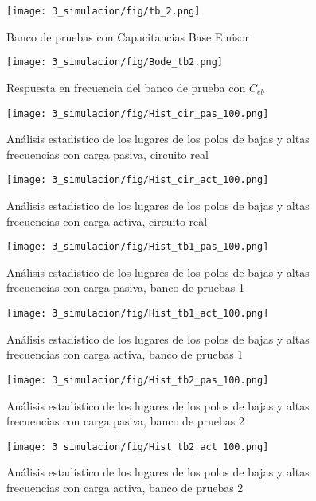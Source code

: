 \begin{figure}
    \centering
    \texttt{[image: 3\_simulacion/fig/tb\_2.png]}
    \caption{Banco de pruebas con Capacitancias Base Emisor}
\end{figure}

\begin{figure}
    \centering
    \texttt{[image: 3\_simulacion/fig/Bode\_tb2.png]}
    \caption{Respuesta en frecuencia del banco de prueba con $C_{eb}$}
    \label{fig:bode_tb2}
\end{figure}

\begin{figure}
    \centering
    \texttt{[image: 3\_simulacion/fig/Hist\_cir\_pas\_100.png]}
    \caption{Análisis estadístico de los lugares de los polos de bajas y altas frecuencias con carga pasiva, circuito real}
\end{figure}

\begin{figure}
    \centering
    \texttt{[image: 3\_simulacion/fig/Hist\_cir\_act\_100.png]}
    \caption{Análisis estadístico de los lugares de los polos de bajas y altas frecuencias con carga activa, circuito real}
\end{figure}

\begin{figure}
    \centering
    \texttt{[image: 3\_simulacion/fig/Hist\_tb1\_pas\_100.png]}
    \caption{Análisis estadístico de los lugares de los polos de bajas y altas frecuencias con carga pasiva, banco de pruebas 1}
\end{figure}

\begin{figure}
    \centering
    \texttt{[image: 3\_simulacion/fig/Hist\_tb1\_act\_100.png]}
    \caption{Análisis estadístico de los lugares de los polos de bajas y altas frecuencias con carga activa, banco de pruebas 1}
\end{figure}

\begin{figure}
    \centering
    \texttt{[image: 3\_simulacion/fig/Hist\_tb2\_pas\_100.png]}
    \caption{Análisis estadístico de los lugares de los polos de bajas y altas frecuencias con carga pasiva, banco de pruebas 2}
\end{figure}

\begin{figure}
    \centering
    \texttt{[image: 3\_simulacion/fig/Hist\_tb2\_act\_100.png]}
    \caption{Análisis estadístico de los lugares de los polos de bajas y altas frecuencias con carga activa, banco de pruebas 2}
\end{figure}
